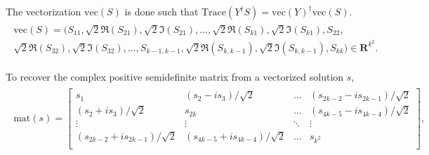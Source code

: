 The vectorization $\text{vec}(S)$ is done such that
$\text{Trace}(Y^\dagger S) = \text{vec}(Y)^\dagger \text{vec}(S)$.
\begin{align}
    \begin{split}\text{vec}(S) = (S_{11}, \sqrt{2} \Re(S_{21}), \sqrt{2} \Im(S_{21}), \ldots, \sqrt{2} \Re(S_{k1}), \sqrt{2} \Im(S_{k1}), S_{22}, \\\sqrt{2}\Re(S_{32}), \sqrt{2}\Im(S_{32}), \dots, S_{k-1,k-1}, \sqrt{2}\Re(S_{k,k-1}), \sqrt{2}\Im(S_{k,k-1}), S_{kk}) \in \mathbf{R}^{k^2}.\end{split}
\end{align}

To recover the complex positive semidefinite matrix from a vectorized solution $s$,
\begin{align}
    \begin{split}\text{mat}(s) =  \begin{bmatrix}
            s_{1}                             & (s_{2} - i s_3) / \sqrt{2}        & \ldots & (s_{2k-2} - is_{2k-1}) / \sqrt{2} \\
            (s_{2} + i s_3) / \sqrt{2}        & s_{2k}                            & \ldots & (s_{4k-5} - is_{4k-4}) / \sqrt{2} \\
            \vdots                            & \vdots                            & \ddots & \vdots                            \\
            (s_{2k-2} + is_{2k-1}) / \sqrt{2} & (s_{4k-5} + is_{4k-4}) / \sqrt{2} & \ldots & s_{k^2}                           \\
        \end{bmatrix}
        ,\end{split}
\end{align}

